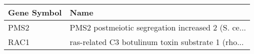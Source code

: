 \begin{tabular}{ll}
\toprule
Gene Symbol &                                               Name \\
\midrule
       PMS2 & PMS2 postmeiotic segregation increased 2 (S. ce... \\
       RAC1 & ras-related C3 botulinum toxin substrate 1 (rho... \\
\bottomrule
\end{tabular}
